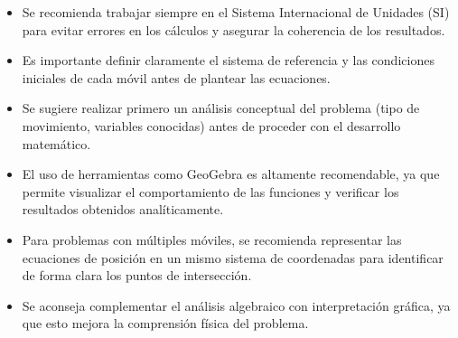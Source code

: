 \begin{itemize}
    \item Se recomienda trabajar siempre en el Sistema Internacional de Unidades (SI) para evitar errores en los cálculos y asegurar la coherencia de los resultados.
    
    \item Es importante definir claramente el sistema de referencia y las condiciones iniciales de cada móvil antes de plantear las ecuaciones.
    
    \item Se sugiere realizar primero un análisis conceptual del problema (tipo de movimiento, variables conocidas) antes de proceder con el desarrollo matemático.
    
    \item El uso de herramientas como GeoGebra es altamente recomendable, ya que permite visualizar el comportamiento de las funciones y verificar los resultados obtenidos analíticamente.
    
    \item Para problemas con múltiples móviles, se recomienda representar las ecuaciones de posición en un mismo sistema de coordenadas para identificar de forma clara los puntos de intersección.
    
    \item Se aconseja complementar el análisis algebraico con interpretación gráfica, ya que esto mejora la comprensión física del problema.
\end{itemize}